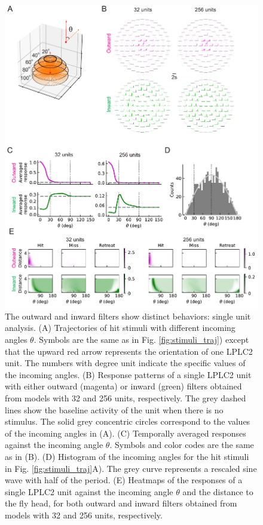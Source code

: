 \documentclass[pdftex,9pt,lineno]{elife}
\begin{document}
\begin{figure}
\includegraphics[width=\linewidth]{figures/compare_outward_inward_single_unit_paper.pdf}
\caption{The outward and inward filters show distinct behaviors: single unit analysis. (A) Trajectories of hit stimuli with different incoming angles $\theta$. Symbols are the same as in Fig. \ref{fig:stimuli_traj}) except that the upward red arrow represents the orientation of one LPLC2 unit. The numbers with degree unit indicate the specific values of the incoming angles. (B) Response patterns of a single LPLC2 unit with either outward (magenta) or inward (green) filters obtained from models with 32 and 256 units, respectively. The grey dashed lines show the baseline activity of the unit when there is no stimulus. The solid grey concentric circles correspond to the values of the incoming angles in (A). (C) Temporally averaged responses against the incoming angle $\theta$. Symbols and color codes are the same as in (B). (D) Histogram of the incoming angles for the hit stimuli in Fig. \ref{fig:stimuli_traj}A). The grey curve represents a rescaled sine wave with half of the period. (E) Heatmaps of the responses of a single LPLC2 unit against the incoming angle $\theta$ and the distance to the fly head, for both outward and inward filters obtained from models with 32 and 256 units, respectively.}

\end{figure}
\end{document}
